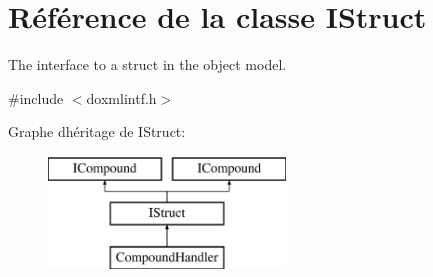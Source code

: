 \hypertarget{class_i_struct}{}\section{Référence de la classe I\+Struct}
\label{class_i_struct}


The interface to a struct in the object model.  




{\ttfamily \#include $<$doxmlintf.\+h$>$}

Graphe d\textquotesingle{}héritage de I\+Struct\+:\begin{figure}[H]
\begin{center}
\leavevmode
\includegraphics[height=3.000000cm]{class_i_struct}
\end{center}
\end{figure}
